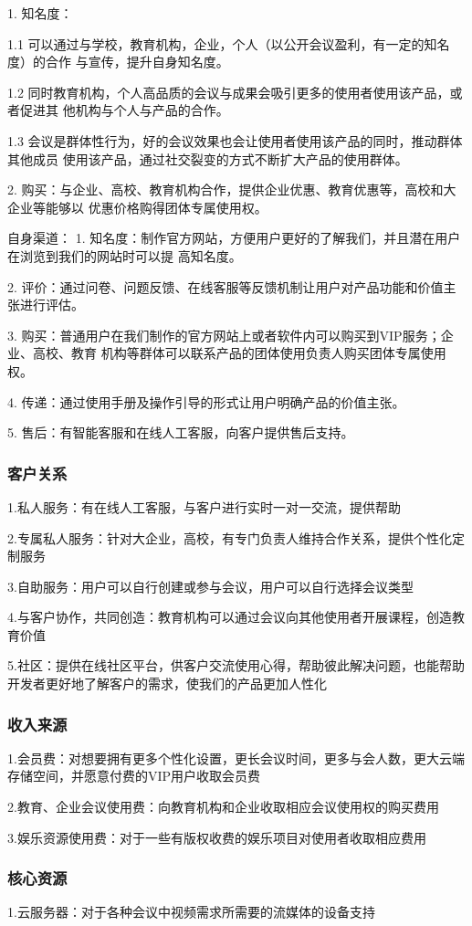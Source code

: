 \documentclass[a4paper,12pt]{article}
\begin{document}
1. 知名度：

1.1 可以通过与学校，教育机构，企业，个人（以公开会议盈利，有一定的知名度）的合作
与宣传，提升自身知名度。

1.2 同时教育机构，个人高品质的会议与成果会吸引更多的使用者使用该产品，或者促进其
他机构与个人与产品的合作。

1.3 会议是群体性行为，好的会议效果也会让使用者使用该产品的同时，推动群体其他成员
使用该产品，通过社交裂变的方式不断扩大产品的使用群体。


2. 购买：与企业、高校、教育机构合作，提供企业优惠、教育优惠等，高校和大企业等能够以
优惠价格购得团体专属使用权。

\noindent 自身渠道：
1. 知名度：制作官方网站，方便用户更好的了解我们，并且潜在用户在浏览到我们的网站时可以提
高知名度。

2. 评价：通过问卷、问题反馈、在线客服等反馈机制让用户对产品功能和价值主张进行评估。

3. 购买：普通用户在我们制作的官方网站上或者软件内可以购买到VIP服务；企业、高校、教育
机构等群体可以联系产品的团体使用负责人购买团体专属使用权。

4. 传递：通过使用手册及操作引导的形式让用户明确产品的价值主张。

5. 售后：有智能客服和在线人工客服，向客户提供售后支持。
\subsubsection{客户关系}
1.私人服务：有在线人工客服，与客户进行实时一对一交流，提供帮助

2.专属私人服务：针对大企业，高校，有专门负责人维持合作关系，提供个性化定制服务

3.自助服务：用户可以自行创建或参与会议，用户可以自行选择会议类型

4.与客户协作，共同创造：教育机构可以通过会议向其他使用者开展课程，创造教育价值

5.社区：提供在线社区平台，供客户交流使用心得，帮助彼此解决问题，也能帮助开发者更好地了解客户的需求，使我们的产品更加人性化
\subsubsection{收入来源}
1.会员费：对想要拥有更多个性化设置，更长会议时间，更多与会人数，更大云端存储空间，并愿意付费的VIP用户收取会员费

2.教育、企业会议使用费：向教育机构和企业收取相应会议使用权的购买费用

3.娱乐资源使用费：对于一些有版权收费的娱乐项目对使用者收取相应费用
\subsubsection{核心资源}
1.云服务器：对于各种会议中视频需求所需要的流媒体的设备支持
\end{document}
